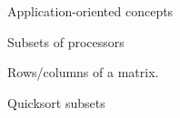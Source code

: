 






 {Application-oriented concepts}

 {Subsets of processors}

Rows/columns of a matrix.

Quicksort subsets

